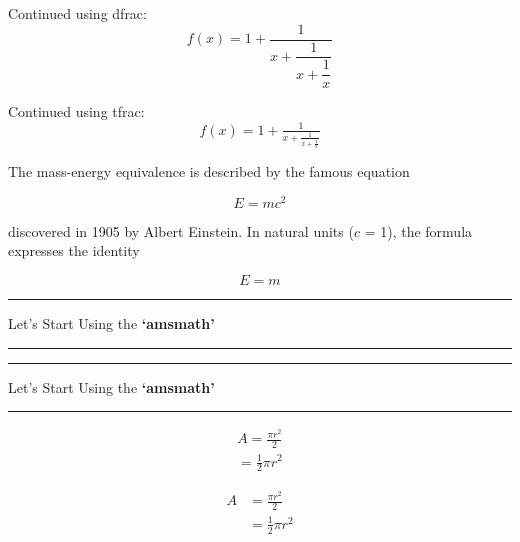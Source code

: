 \documentclass[12pt, letterpaper]{article}
\begin{document}
Continued using dfrac:
\[
f(x) = 1 + \dfrac{1}{x + \dfrac{1}{x + \dfrac{1}{x}}}
\]


Continued using tfrac:
\[
f(x) = 1 + \tfrac{1}{x + \tfrac{1}{x + \tfrac{1}{x}}}
\]















\newpage


The mass-energy equivalence is described by the famous equation

\[E=mc^2\]

discovered in 1905 by Albert Einstein. 
In natural units ($c$ = 1), the formula expresses the identity

\begin{equation}
E=m
\end{equation}


\newcommand{\titlevariable}{Let's Start Using the \textbf{`amsmath'}}

\noindent\rule{\linewidth}{5pt}
\begin{center}
\titlevariable \par
\end{center}
\noindent\rule{\linewidth}{5pt}


\begin{center}
\noindent\rule{\linewidth}{5pt}
\titlevariable \par
\noindent\rule{\linewidth}{5pt}
\end{center}




\begin{equation*}
\begin{split}
A = \frac{\pi r^2}{2} \\
  = \frac{1}{2} \pi r^2
\end{split}
\end{equation*}




\begin{equation} \label{eq1}
\begin{split}
A & = \frac{\pi r^2}{2} \\
 & = \frac{1}{2} \pi r^2
\end{split}
\end{equation}
\end{document}
